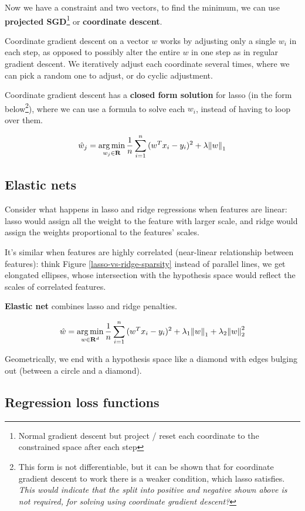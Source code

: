 \documentclass{article}
\DeclareMathOperator*{\argmin}{arg\,min}
\begin{document}
Now we have a constraint and two vectors, to find the minimum, we can use \textbf{projected SGD}\footnote{Normal gradient descent but project / reset each coordinate to the constrained space after each step} or \textbf{coordinate descent}.

Coordinate gradient descent on a vector $w$ works by adjusting only a single $w_i$ in each step, as opposed to possibly alter the entire $w$ in one step as in regular gradient descent.
We iteratively adjust each coordinate several times, where we can pick a random one to adjust, or do cyclic adjustment.

Coordinate gradient descent has a \textbf{closed form solution} for lasso (in the form below\footnote{This form is not differentiable, but it can be shown that for coordinate gradient descent to work there is a weaker condition, which lasso satisfies. \textit{This would indicate that the split into positive and negative shown above is not required, for solving using coordinate gradient descent?}}), where we can use a formula to solve each $w_i$, instead of having to loop over them.

$$
\hat{w}_j = \argmin_{w_j \in \mathbf{R}}{\frac{1}{n} \sum_{i = 1}^{n}{(w^{T} x_i - y_i)^2} + \lambda \norm{w}_1}
$$

\subsection{Elastic nets}

Consider what happens in lasso and ridge regressions when features are linear:
lasso would assign all the weight to the feature with larger scale, and ridge would assign the weights proportional to the features' scales.

It's similar when features are highly correlated (near-linear relationship between features):
think Figure \ref{lasso-vs-ridge-sparsity} instead of parallel lines, we get elongated ellipses, whose intersection with the hypothesis space would reflect the scales of correlated features.

\textbf{Elastic net} combines lasso and ridge penalties.

$$
\hat{w} = \argmin_{w \in \mathbf{R}^{d}}{\frac{1}{n} \sum_{i = 1}^{n}{(w^{T} x_i - y_i)^2} + \lambda_1 \norm{w}_1 + \lambda_2 \norm{w}_2^2}
$$

Geometrically, we end with a hypothesis space like a diamond with edges bulging out (between a circle and a diamond).

\subsection{Regression loss functions}
\end{document}
